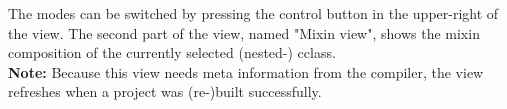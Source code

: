 The modes can be switched by pressing the control button in the upper-right of the view. The second part of the view, named "Mixin view", shows the mixin composition of the currently selected (nested-) cclass.\\
\textbf{Note:} Because this view needs meta information from the compiler, the view refreshes when a project was (re-)built successfully.


